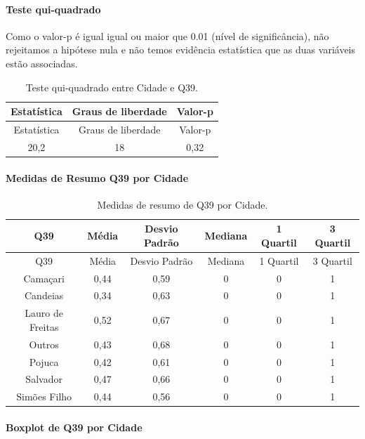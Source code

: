 \documentclass[]{article}
\let\oldparagraph\paragraph
\renewcommand{\paragraph}[1]{\oldparagraph{#1}\mbox{}}
\begin{document}
\hypertarget{teste-qui-quadrado-127}{%
\paragraph{Teste qui-quadrado}\label{teste-qui-quadrado-127}}

Como o valor-p é igual igual ou maior que 0.01 (nível de significância), não rejeitamos a hipótese nula e não temos evidência estatística que as duas variáveis estão associadas.

\begin{longtable}[]{@{}ccc@{}}
\caption{\label{tab:unnamed-chunk-1490}Teste qui-quadrado entre Cidade e Q39.}\tabularnewline
\toprule
Estatística & Graus de liberdade & Valor-p\tabularnewline
\midrule
\endfirsthead
\toprule
Estatística & Graus de liberdade & Valor-p\tabularnewline
\midrule
\endhead
20,2 & 18 & 0,32\tabularnewline
\bottomrule
\end{longtable}

\cleardoublepage

\hypertarget{medidas-de-resumo-q39-por-cidade}{%
\paragraph{Medidas de Resumo Q39 por Cidade}\label{medidas-de-resumo-q39-por-cidade}}

\begin{longtable}[]{@{}cccccc@{}}
\caption{\label{tab:unnamed-chunk-1491}Medidas de resumo de Q39 por Cidade.}\tabularnewline
\toprule
Q39 & Média & Desvio Padrão & Mediana & 1 Quartil & 3 Quartil\tabularnewline
\midrule
\endfirsthead
\toprule
Q39 & Média & Desvio Padrão & Mediana & 1 Quartil & 3 Quartil\tabularnewline
\midrule
\endhead
Camaçari & 0,44 & 0,59 & 0 & 0 & 1\tabularnewline
Candeias & 0,34 & 0,63 & 0 & 0 & 1\tabularnewline
Lauro de Freitas & 0,52 & 0,67 & 0 & 0 & 1\tabularnewline
Outros & 0,43 & 0,68 & 0 & 0 & 1\tabularnewline
Pojuca & 0,42 & 0,61 & 0 & 0 & 1\tabularnewline
Salvador & 0,47 & 0,66 & 0 & 0 & 1\tabularnewline
Simões Filho & 0,44 & 0,56 & 0 & 0 & 1\tabularnewline
\bottomrule
\end{longtable}

\hypertarget{boxplot-de-q39-por-cidade}{%
\paragraph{Boxplot de Q39 por Cidade}\label{boxplot-de-q39-por-cidade}}
\end{document}

